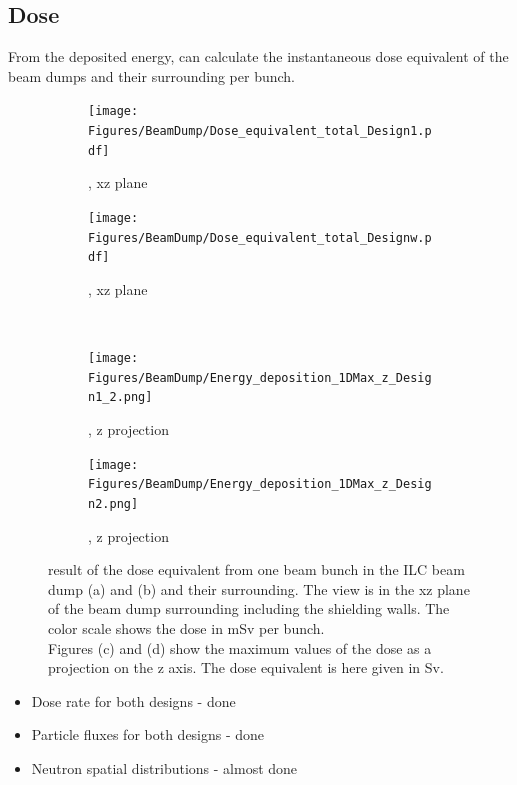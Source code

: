 \subsection{Dose}
\label{BeamDumps:sim_surrounding:Dose} 
From the deposited energy, \fluka can calculate the instantaneous dose equivalent of the beam dumps and their surrounding per bunch.
\begin{figure}[h]
 \centering
  \begin{subfigure}[b]{0.49\textwidth}
   \centering
    \texttt{[image: Figures/BeamDump/Dose\_equivalent\_total\_Design1.pdf]}
   \caption{\designone, xz plane}
   \end{subfigure}
   \hfill
    \begin{subfigure}[b]{0.49\textwidth}
   \centering
    \texttt{[image: Figures/BeamDump/Dose\_equivalent\_total\_Designw.pdf]}
   \caption{\designtwo, xz plane}
   \end{subfigure}\\ \vspace*{0.3cm}
     \begin{subfigure}[b]{0.49\textwidth}
   \centering
    \texttt{[image: Figures/BeamDump/Energy\_deposition\_1DMax\_z\_Design1\_2.png]}
   \caption{\designone, z projection}
   \end{subfigure}
   \hfill
    \begin{subfigure}[b]{0.49\textwidth}
   \centering
    \texttt{[image: Figures/BeamDump/Energy\_deposition\_1DMax\_z\_Design2.png]}
   \caption{\designtwo, z projection}
   \end{subfigure}
   \caption[Dose equivalent in the ILC main beam dump]{\fluka result of the dose equivalent from one beam bunch in the ILC beam dump \designone (a) and \designtwo (b) and their surrounding.
   The view is in the xz plane of the beam dump surrounding including the shielding walls.
   The color scale shows the dose in \si{\milli\sievert} per bunch.
   \\Figures (c) and (d) show the maximum values of the dose as a projection on the z axis.
   The dose equivalent is here given in \si{\sievert}.}
   \label{fig:BeamDumps:Dose}
\end{figure}
 
\begin{itemize}
 \item Dose rate for both designs - done 
 \item Particle fluxes for both designs - done 
 \item Neutron spatial distributions - almost done
\end{itemize}


